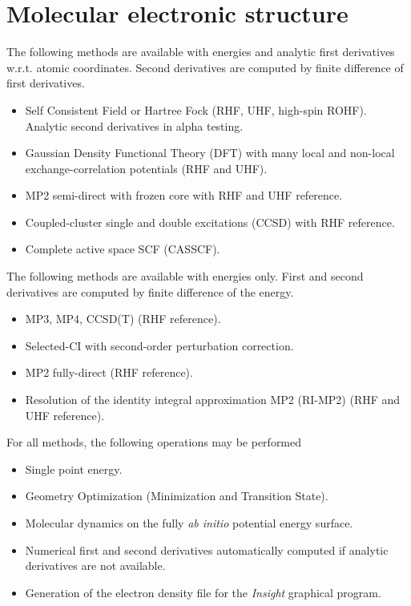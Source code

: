 \label{sec:functionality}

\section{Molecular electronic structure}

The following methods are available with energies and analytic first
derivatives w.r.t. atomic coordinates.  Second derivatives are
computed by finite difference of first derivatives.
\begin{itemize}
\item Self Consistent Field or Hartree Fock (RHF, UHF, high-spin
  ROHF).  Analytic second derivatives in alpha testing.  
\item Gaussian Density Functional Theory (DFT) with many local and
  non-local exchange-correlation potentials (RHF and UHF).
\item MP2 semi-direct with frozen core with RHF and UHF reference.
\item Coupled-cluster single and double excitations (CCSD) with RHF
  reference.
\item Complete active space SCF (CASSCF).
\end{itemize}

The following methods are available with energies only.  First and
second derivatives are computed by finite difference of the energy.
\begin{itemize}
\item MP3, MP4, CCSD(T) (RHF reference).
\item Selected-CI with second-order perturbation correction.
\item MP2 fully-direct (RHF reference).
\item Resolution of the identity integral approximation MP2 (RI-MP2)
  (RHF and UHF reference).
\end{itemize}

For all methods, the following operations may be performed
\begin{itemize}
\item Single point energy.
\item Geometry Optimization (Minimization and Transition State).
\item Molecular dynamics on the fully {\em ab initio} potential energy
  surface.
\item Numerical first and second derivatives automatically computed if
  analytic derivatives are not available.
\item Generation of the electron density file for the {\em Insight}
      graphical program.
\end{itemize}

